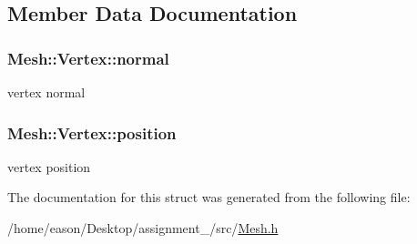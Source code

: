\subsection{Member Data Documentation}
\subsubsection[{\texorpdfstring{normal}{normal}}]{ Mesh\+::\+Vertex\+::normal}\hypertarget{structMesh_1_1Vertex_adf43225146648954d9196e4b6fa47379}{}\label{structMesh_1_1Vertex_adf43225146648954d9196e4b6fa47379}


vertex normal 

\subsubsection[{\texorpdfstring{position}{position}}]{ Mesh\+::\+Vertex\+::position}\hypertarget{structMesh_1_1Vertex_a6ee1c5ba29f0bf02bf446845de25548f}{}\label{structMesh_1_1Vertex_a6ee1c5ba29f0bf02bf446845de25548f}


vertex position 



The documentation for this struct was generated from the following file\+:\begin{DoxyCompactItemize}
\item 
/home/eason/\+Desktop/assignment\+\_/src/\hyperlink{Mesh_8h}{Mesh.\+h}\end{DoxyCompactItemize}
